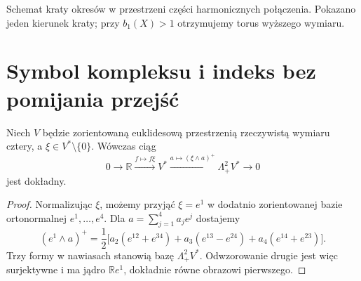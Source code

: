 \begin{center}

{\footnotesize Schemat kraty okresów w przestrzeni części harmonicznych
połączenia. Pokazano jeden kierunek kraty; przy $b_1(X)>1$
otrzymujemy torus wyższego wymiaru.}
\end{center}

\section{Symbol kompleksu i indeks bez pomijania przejść}
\label{sec:tg-sw12-symbol}

\begin{lemat}
\label{lem:tg-sw12-symbol}
Niech $V$ będzie zorientowaną euklidesową przestrzenią
rzeczywistą wymiaru cztery, a $\xi\in V^*\setminus\{0\}$.
Wówczas ciąg
\[
0\longrightarrow\mathbb R
\xrightarrow{f\mapsto f\xi}V^*
\xrightarrow{a\mapsto(\xi\wedge a)^+}\Lambda^2_+V^*
\longrightarrow0
\]
jest dokładny.
\end{lemat}

\begin{proof}
Normalizując $\xi$, możemy przyjąć $\xi=e^1$ w dodatnio
zorientowanej bazie ortonormalnej $e^1,\dots,e^4$.
Dla $a=\sum_{j=1}^4a_je^j$ dostajemy
\[
(e^1\wedge a)^+=\frac12\bigl[
 a_2(e^{12}+e^{34})+a_3(e^{13}-e^{24})
 +a_4(e^{14}+e^{23})\bigr].
\]
Trzy formy w nawiasach stanowią bazę $\Lambda^2_+V^*$.
Odwzorowanie drugie jest więc surjektywne i ma jądro
$\mathbb Re^1$, dokładnie równe obrazowi pierwszego.
\end{proof}

